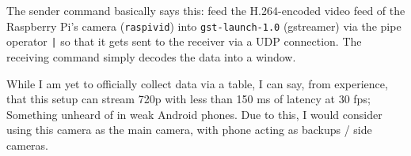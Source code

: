 The sender command basically says this: feed the H.264-encoded video feed of the Raspberry Pi's camera (\texttt{raspivid}) into \texttt{gst-launch-1.0} (gstreamer) via the pipe operator \texttt{|} so that it gets sent to the receiver via a UDP connection. The receiving command simply decodes the data into a window.

While I am yet to officially collect data via a table, I can say, from experience, that this setup can stream 720p with less than 150 ms of latency at 30 fps; Something unheard of in weak Android phones. Due to this, I would consider using this camera as the main camera, with phone acting as backups / side cameras.
